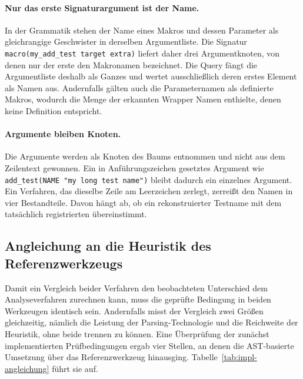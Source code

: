 \documentclass[12pt,a4paper,twoside,headsepline,parskip=half]{scrreprt}
\begin{document}
\paragraph{Nur das erste Signaturargument ist der Name.}
In der Grammatik stehen der Name eines Makros und dessen Parameter als gleichrangige
Geschwister in derselben Argumentliste. Die Signatur
\texttt{macro(my\_add\_test target extra)} liefert daher drei Argumentknoten, von denen
nur der erste den Makronamen bezeichnet. Die Query fängt die Argumentliste deshalb
als Ganzes und wertet ausschließlich deren erstes Element als Namen aus. Andernfalls
gälten auch die Parameternamen als definierte Makros, wodurch die Menge der
erkannten Wrapper Namen enthielte, denen keine Definition entspricht.

\paragraph{Argumente bleiben Knoten.}
Die Argumente werden als Knoten des Baums entnommen und nicht aus dem Zeilentext
gewonnen. Ein in Anführungszeichen gesetztes Argument wie
\texttt{add\_test(NAME "my long test name")} bleibt dadurch ein einzelnes Argument. Ein
Verfahren, das dieselbe Zeile am Leerzeichen zerlegt, zerreißt den Namen in vier
Bestandteile. Davon hängt ab, ob ein rekonstruierter Testname mit dem tatsächlich
registrierten übereinstimmt.

\subsection{Angleichung an die Heuristik des Referenzwerkzeugs}
\label{sec:impl-angleichung}

Damit ein Vergleich beider Verfahren den beobachteten Unterschied dem Analyseverfahren
zurechnen kann, muss die geprüfte Bedingung in beiden Werkzeugen identisch sein.
Andernfalls misst der Vergleich zwei Größen gleichzeitig, nämlich die Leistung der
Parsing-Technologie und die Reichweite der Heuristik, ohne beide trennen zu können.
Eine Überprüfung der zunächst implementierten Prüfbedingungen ergab vier Stellen, an
denen die AST-basierte Umsetzung über das Referenzwerkzeug hinausging.
Tabelle~\ref{tab:impl-angleichung} führt sie auf.
\end{document}
